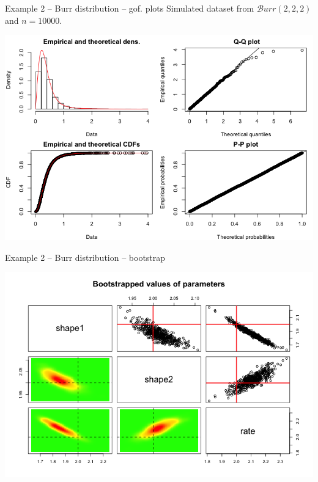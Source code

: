 \documentclass[8pt, hide notes]{beamer}
\begin{document}
\begin{frame}{Example 2 -- Burr distribution -- gof. plots}
Simulated dataset from $\mathcal Burr(2,2,2)$ and $n=10000$.

\centering
\includegraphics[width=\textwidth]{img/burr-plotdist}


\end{frame}

\begin{frame}{Example 2 -- Burr distribution -- bootstrap}

\centering
\includegraphics[width=1.05\textwidth]{img/burr-bootdist}

\end{frame}
\end{document}
